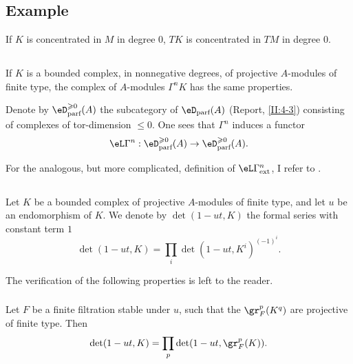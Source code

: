 \documentclass[oneside]{book}
\begin{document}
\subsection{Example}\label{III:1-5}

If $K$ is concentrated in $M$ in degree $0$, $T K$ is concentrated in $T M$
in degree $0$.






\subsection{}\label{III:1-6}

If $K$ is a bounded complex, in nonnegative degrees, of projective
$A$-modules of finite type, the complex of $A$-modules $\Gamma^n K$ has the
same properties.

Denote by $\eD_\text{parf}^{\geqslant 0}(A)$ the subcategory of
$\eD_\text{parf}(A)$ (Report, \ref{II:4-3}) consisting of complexes of
tor-dimension $\leqslant 0$. One sees that $\Gamma^n$ induces a functor
\[
  \eL\Gamma^n : \eD_\text{parf}^{\geqslant 0}(A) \to \eD_\text{parf}^{\geqslant 0}(A) \text{.}
\]

For the analogous, but more complicated, definition of
$\eL\Gamma_\text{ext}^n$, I refer to \cite[XVII 5.5.14]{sga4}.






\subsection{}\label{III:1-7}

Let $K$ be a bounded complex of projective $A$-modules of finite type, and let
$u$ be an endomorphism of $K$. We denote by $\det(1-u t,K)$ the formal series
with constant term $1$
\[
  \det(1-u t,K) = \prod_i \det(1-u t,K^i)^{(-1)^i} \text{.}
\]

The verification of the following properties is left to the reader.


\subsubsection{}\label{III:1-7-1}

Let $F$ be a finite filtration stable under $u$, such that the
$\gr_F^p(K^q)$ are projective of finite type. Then
\[
  \det(1-u t,K) = \prod_p \det(1-u t,\gr_F^p(K)) \text{.}
\]


\subsubsection{}\label{III:1-7-2}
\end{document}
